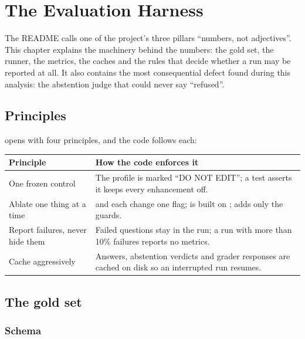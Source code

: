 \chapter{The Evaluation Harness}
\label{ch:evaluation}

The README calls one of the project's three pillars \enquote{numbers, not adjectives}. This chapter explains the machinery behind the numbers: the gold set, the runner, the metrics, the caches and the rules that decide whether a run may be reported at all. It also contains the most consequential defect found during this analysis: the abstention judge that could never say \enquote{refused}.

\section{Principles}

 opens with four principles, and the code follows each:

\begin{center}
\begin{tabularx}{\textwidth}{@{}>{\raggedright\arraybackslash}p{4.2cm}L@{}}
\toprule
\textbf{Principle} & \textbf{How the code enforces it}\\
\midrule
One frozen control & The  profile is marked \enquote{DO NOT EDIT}; a test asserts it keeps every enhancement off.\\
Ablate one thing at a time &  and  each change one flag;  is built on ;  adds only the guards.\\
Report failures, never hide them & Failed questions stay in the run; a run with more than 10\% failures reports no metrics.\\
Cache aggressively & Answers, abstention verdicts and grader responses are cached on disk so an interrupted run resumes.\\
\bottomrule
\end{tabularx}
\end{center}

\section{The gold set}
\label{sec:goldset}

\subsection{Schema}

